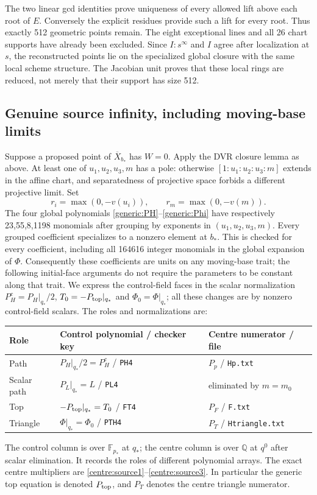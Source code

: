 \documentclass[11pt,a4paper]{article}
\theoremstyle{remark}\newtheorem{remark}[theorem]{Remark}
\begin{document}
The two linear gcd identities prove uniqueness of every allowed lift
above each root of $E$. Conversely the explicit residues provide such
a lift for every root. Thus exactly 512 geometric points remain. The
eight exceptional lines and all 26 chart supports have already been
excluded. Since $I:s^\infty$ and $I$ agree after localization at $s$,
the reconstructed points lie on the specialized global closure with the
same local scheme structure. The Jacobian unit proves that these local
rings are reduced, not merely that their support has size 512.

\subsection{Genuine source infinity, including moving-base limits}
\label{generic:infinity}
Suppose a proposed point of $\overline X_{b_*}$ has $W=0$. Apply the
DVR closure lemma as above. At least one of $u_1,u_2,u_3,m$ has a pole:
otherwise $[1:u_1:u_2:u_3:m]$ extends in the affine chart, and
separatedness of projective space forbids a different projective limit.
Set
\[
 r_i=\max(0,-v(u_i)),\qquad r_m=\max(0,-v(m)).
\]
The four global polynomials \eqref{generic:PH}--\eqref{generic:Phi}
have respectively 23,55,8,1198 monomials after grouping by exponents
in $(u_1,u_2,u_3,m)$. Every grouped coefficient specializes to a nonzero
element at $b_*$. This is checked for every coefficient, including all
164616 integer monomials in the global expansion of $\Phi$.
Consequently these coefficients are units on any moving-base trait;
the following initial-face arguments do not require the parameters to
be constant along that trait. We express the control-field faces in
the scalar normalization $P_H^c=P_H|_{q_*}/2$,
$T_0=-P_{\rm top}|_{q_*}$ and $\Phi_0=\Phi|_{q_*}$; all these changes are
by nonzero control-field scalars. The roles and normalizations are:
\begin{center}\small
\begin{tabular}{@{}lll@{}}\toprule
Role & Control polynomial / checker key & Centre numerator / file\\\midrule
Path & $P_H|_{q_*}/2=P_H^c$ / \texttt{PH4} & $P_p$ / \texttt{Hp.txt}\\
Scalar path & $P_L|_{q_*}=L$ / \texttt{PL4} & eliminated by $m=m_0$\\
Top & $-P_{\rm top}|_{q_*}=T_0$ / \texttt{FT4} & $P_F$ / \texttt{F.txt}\\
Triangle & $\Phi|_{q_*}=\Phi_0$ / \texttt{PTH4} & $P_T$ / \texttt{Htriangle.txt}\\
\bottomrule\end{tabular}
\end{center}
The control column is over $\mathbb F_{p_*}$ at $q_*$; the centre column
is over $\mathbb Q$ at $q^0$ after scalar elimination. It records the
roles of different polynomial arrays. The exact centre multipliers are
\eqref{centre:source1}--\eqref{centre:source3}. In particular the generic
top equation is denoted $P_{\rm top}$, and $P_T$ denotes the centre
triangle numerator.
\end{document}
